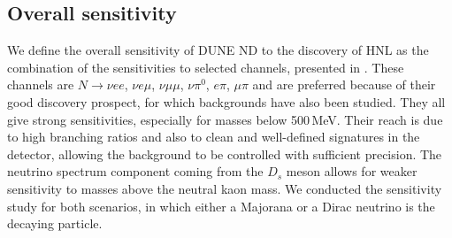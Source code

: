 \subsection{Overall sensitivity}

We define the overall sensitivity of DUNE ND to the discovery of HNL as the combination of the sensitivities to selected channels, %
presented in .
These channels are $N\to\nu e e$, $\nu e \mu$, $\nu \mu \mu$, $\nu \pi^0$, $e \pi$, $\mu \pi$ and are preferred because of %
their good discovery prospect, for which backgrounds have also been studied.
They all give strong sensitivities, especially for masses below 500\,MeV.
Their reach is due to high branching ratios and also to clean and well-defined signatures in the detector, %
allowing the background to be controlled with sufficient precision.
The neutrino spectrum component coming from the $D_s$ meson allows for weaker sensitivity %
to masses above the neutral kaon mass.
We conducted the sensitivity study for both scenarios, in which either a Majorana or a Dirac neutrino is the decaying particle.

